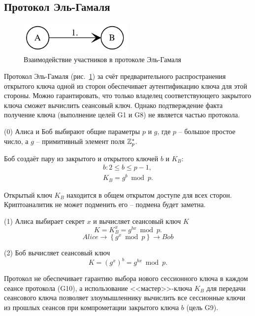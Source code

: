 \subsection{Протокол Эль-Гамаля}

\begin{figure}
    \centering
    \includegraphics[width=0.5\textwidth]{pic/key_distribution-el-gamal}
    \caption{Взаимодействие участников в протоколе Эль-Гамаля\label{fig:key_distribution-el-gamal}}
\end{figure}

Протокол Эль-Гамаля (рис.~\ref{fig:key_distribution-el-gamal}) за счёт предварительного распространения открытого ключа одной из сторон обеспечивает аутентификацию ключа для этой стороны. Можно гарантировать, что только владелец соответствующего закрытого ключа сможет вычислить сеансовый ключ. Однако подтверждение факта получение ключа (выполнение целей G1 и G8) не является частью протокола.

\begin{protocol}
    \item[(0)] Алиса и Боб выбирают общие параметры $p$ и $g$, где $p$ -- большое простое число, а $g$ -- примитивный элемент поля $\mathbb{Z}_p^*$.
    \item[{}] Боб создаёт пару из закрытого и открытого ключей $b$ и $K_B$:
        \[\begin{array}{l}
            b: 2 \leq b \leq p - 1, \\
            K_B = g^b \bmod p.
        \end{array}\]
    \item[{}] Открытый ключ $K_B$ находится в общем открытом доступе для всех сторон. Криптоаналитик не может подменить его -- подмена будет заметна.
    \item[(1)] Алиса выбирает секрет $x$ и вычисляет сеансовый ключ $K$
        \[ K = K_B^{x} = g^{bx} \bmod p. \]
        \[ Alice \to \left\{ g^x \bmod p \right\} \to Bob\]
    \item[(2)] Боб вычисляет сеансовый ключ
        \[ K = (g^x)^{b} = g^{bx} \bmod p. \]
\end{protocol}

Протокол не обеспечивает гарантию выбора нового сессионного ключа в каждом сеансе протокола (G10), а использование <<мастер>>-ключа $K_B$ для передачи сеансового ключа позволяет злоумышленнику вычислить все сессионные ключи из прошлых сеансов при компрометации закрытого ключа $b$ (цель G9).

